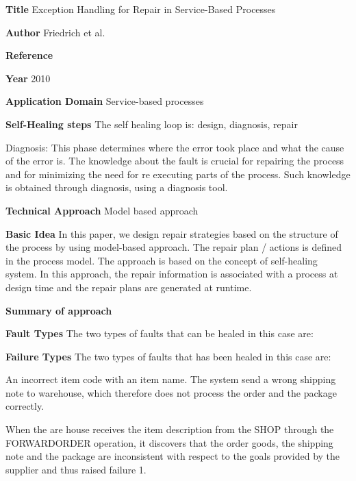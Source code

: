 \begin{compactitem}

\item[\textbf{Title}]Exception Handling for Repair in Service-Based Processes

\item[\textbf{Author}]Friedrich et al.

\item[\textbf{Reference}] 

\cite{friedrich2010exception}

\item[\textbf{Year}] 2010

\item[\textbf{Application Domain}]
Service-based processes

\item[\textbf{Self-Healing steps}] The self healing loop is: design, diagnosis, repair


Diagnosis: This phase determines where the error took place and what the cause of the error is. The knowledge about the fault is crucial for repairing the process and for minimizing the need for re executing parts of the process. Such knowledge is obtained through diagnosis,  using a diagnosis tool.

\item[\textbf{Technical Approach}]Model based approach

\item[\textbf{Basic Idea}] In this paper, we design repair strategies based on the structure of the process by using model-based approach. The repair plan / actions is defined in the process model. The approach is based on the concept of self-healing system. In this approach, the repair information is associated with a process at design time and the repair plans are generated at runtime.

\item[\textbf{Summary of approach}]

\item[\textbf{Fault Types}]The two types of faults that can be healed in this case are: 

\item[\textbf{Failure Types}]The two types of faults that has been healed in this case are:

An incorrect item code with an item name. The system send a wrong shipping note to warehouse, which therefore does not process the order and the package correctly.


When the are house receives the item description from the SHOP through the FORWARDORDER operation, it discovers that the order goods, the shipping note and the package are inconsistent with respect to the goals provided by the supplier and thus raised failure 1.


\end{compactitem}
